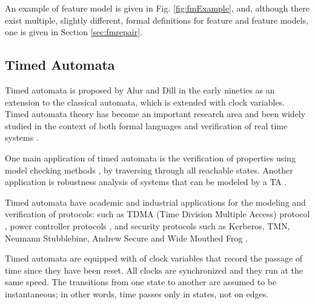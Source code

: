 
An example of feature model is given in Fig. \ref{fig:fmExample}, and, although there exist multiple, slightly different, formal definitions for feature and feature models, one is given in Section \ref{sec:fmrepair}.

\subsection{Timed Automata}

Timed automata is proposed by Alur and Dill \cite{AD94} in the early nineties as an extension to the classical automata, which is extended with clock variables. 
Timed automata theory has become an important research area and been widely studied in the context of both formal languages and verification of real time systems \cite{5521565}.

One main application of timed automata is the verification of properties using model checking methods \cite{clarke_model_checking}, by traversing through all reachable states.
Another application is robustness analysis of systems that can be modeled by a TA \cite{markey2011robustness}.

Timed automata have academic and industrial applications for the modeling and verification of protocols: such as TDMA (Time Division Multiple Access) protocol \cite{tdma}, power controller protocols \cite{havelund_power_controller_1999}, and security protocols such as Kerberos, TMN, Neumann Stubblebine, Andrew Secure and Wide Mouthed Frog \cite{jakubowska2005verifying,jakubowska2007modelling}.

Timed automata are equipped with of clock variables that record the passage of time since they have been reset. All clocks are synchronized and they run at the same speed. 
The transitions from one state to another are assumed to be instantaneous; in other words, time passes only in states, not on edges.

